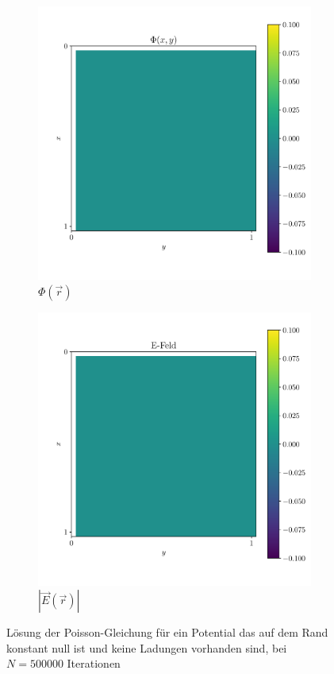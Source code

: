 \begin{figure}[H]
    \centering
    \begin{subfigure}[b]{0.45\textwidth}
        \includegraphics[width=\textwidth]{Abbildungen/Phi_a.pdf}
           \caption{$\Phi\left(\vec{r}\right)$}
   \end{subfigure}
     \begin{subfigure}[b]{0.45\textwidth}
        \includegraphics[width=\textwidth]{Abbildungen/E_a.pdf}
           \caption{$\left|\vec{E}\left(\vec{r}\right)\right|$}
   \end{subfigure}
   \caption{Lösung der Poisson-Gleichung für ein Potential das auf dem Rand konstant null ist und keine Ladungen vorhanden sind, bei
   $N=500000$ Iterationen  }\label{a}
   \end{figure}\noindent
